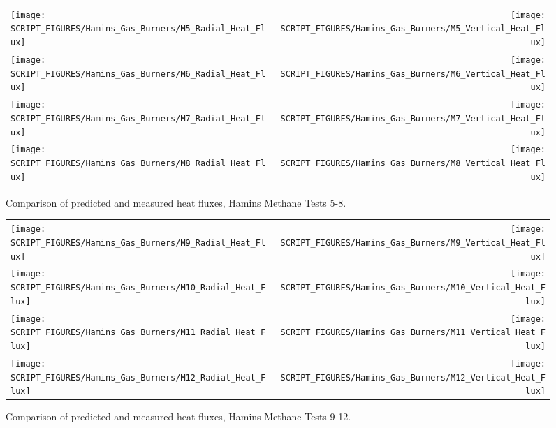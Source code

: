 \begin{figure}[p]
\begin{tabular*}{\textwidth}{l@{\extracolsep{\fill}}r}
\texttt{[image: SCRIPT\_FIGURES/Hamins\_Gas\_Burners/M5\_Radial\_Heat\_Flux]} &
\texttt{[image: SCRIPT\_FIGURES/Hamins\_Gas\_Burners/M5\_Vertical\_Heat\_Flux]} \\
\texttt{[image: SCRIPT\_FIGURES/Hamins\_Gas\_Burners/M6\_Radial\_Heat\_Flux]} &
\texttt{[image: SCRIPT\_FIGURES/Hamins\_Gas\_Burners/M6\_Vertical\_Heat\_Flux]} \\
\texttt{[image: SCRIPT\_FIGURES/Hamins\_Gas\_Burners/M7\_Radial\_Heat\_Flux]} &
\texttt{[image: SCRIPT\_FIGURES/Hamins\_Gas\_Burners/M7\_Vertical\_Heat\_Flux]} \\
\texttt{[image: SCRIPT\_FIGURES/Hamins\_Gas\_Burners/M8\_Radial\_Heat\_Flux]} &
\texttt{[image: SCRIPT\_FIGURES/Hamins\_Gas\_Burners/M8\_Vertical\_Heat\_Flux]}
\end{tabular*}
\label{Hamins_Methane_5-8}
\caption[Heat flux predictions, Hamins methane burner Tests 5-8]
{Comparison of predicted and measured heat fluxes, Hamins Methane Tests 5-8.}
\end{figure}

\begin{figure}[p]
\begin{tabular*}{\textwidth}{l@{\extracolsep{\fill}}r}
\texttt{[image: SCRIPT\_FIGURES/Hamins\_Gas\_Burners/M9\_Radial\_Heat\_Flux]} &
\texttt{[image: SCRIPT\_FIGURES/Hamins\_Gas\_Burners/M9\_Vertical\_Heat\_Flux]} \\
\texttt{[image: SCRIPT\_FIGURES/Hamins\_Gas\_Burners/M10\_Radial\_Heat\_Flux]} &
\texttt{[image: SCRIPT\_FIGURES/Hamins\_Gas\_Burners/M10\_Vertical\_Heat\_Flux]} \\
\texttt{[image: SCRIPT\_FIGURES/Hamins\_Gas\_Burners/M11\_Radial\_Heat\_Flux]} &
\texttt{[image: SCRIPT\_FIGURES/Hamins\_Gas\_Burners/M11\_Vertical\_Heat\_Flux]} \\
\texttt{[image: SCRIPT\_FIGURES/Hamins\_Gas\_Burners/M12\_Radial\_Heat\_Flux]} &
\texttt{[image: SCRIPT\_FIGURES/Hamins\_Gas\_Burners/M12\_Vertical\_Heat\_Flux]}
\end{tabular*}
\label{Hamins_Methane_9-12}
\caption[Heat flux predictions, Hamins methane burner Tests 9-12]
{Comparison of predicted and measured heat fluxes, Hamins Methane Tests 9-12.}
\end{figure}

